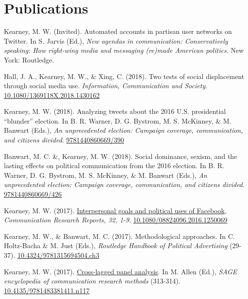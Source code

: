 
\section{Publications}

\begin{bibenum}

\item Kearney, M. W. (Invited).
Automated accounts in partisan user networks on Twitter.
In S. Jarvis (Ed.),
\textit{New agendas in communication: Conservatively speaking: How right-wing media and messaging (re)made American politics}.
New York: Routledge.

\item Hall, J. A., Kearney, M. W., \& Xing, C. (2018).
Two tests of social displacement through social media use.
\textit{Information, Communication and Society}.
\href{https://doi.org/10.1080/1369118X.2018.1430162}{10.1080/1369118X.2018.1430162}

\item Kearney, M. W. (2018).
Analyzing tweets about the 2016 U.S. presidential ``blunder'' election.
In B. R. Warner, D. G. Bystrom, M. S. McKinney, \& M. Banwart (Eds.),
\textit{An unprecedented election: Campaign coverage, communication, and citizens divided}.
\href{http://publisher.abc-clio.com/9781440860669/390}{9781440860669/390}

\item Banwart, M. C. \&, Kearney, M. W. (2018).
Social dominance, sexism, and the lasting effects on political communication from the 2016 election. In B. R. Warner,
D. G. Bystrom, M. S. McKinney, \& M. Banwart (Eds.),
\textit{An unprecedented election: Campaign coverage, communication, and citizens divided}.
\href{http://publisher.abc-clio.com/9781440860669/426}{9781440860669/426}

\item Kearney, M. W. (2017).
\href{http://www.tandfonline.com/doi/abs/10.1080/08824096.2016.1250069}{Interpersonal goals and political uses of Facebook},
\textit{Communication Research Reports, 32, 1-9}.
\href{https://doi.org/10.1080/08824096.2016.1250069}{10.1080/08824096.2016.1250069}

\item[] Kearney, M. W., \& Banwart, M. C. (2017).
Methodological approaches.
In C. Holtz-Bacha \& M. Just (Eds.),
\textit{Routledge Handbook of Political Advertising} (29-37).
\href{https://www.routledgehandbooks.com/doi/10.4324/9781315694504.ch3}{10.4324/9781315694504.ch3}

\item[] Kearney, M. W. (2017).
\href{http://mikewk.com/clpm.pdf}{Cross-lagged panel analysis}.
In M. Allen (Ed.),
\textit{SAGE encyclopedia of communication research methods} (313-314).
\href{http://dx.doi.org/10.4135/9781483381411.n117}{10.4135/9781483381411.n117}


\end{bibenum}
